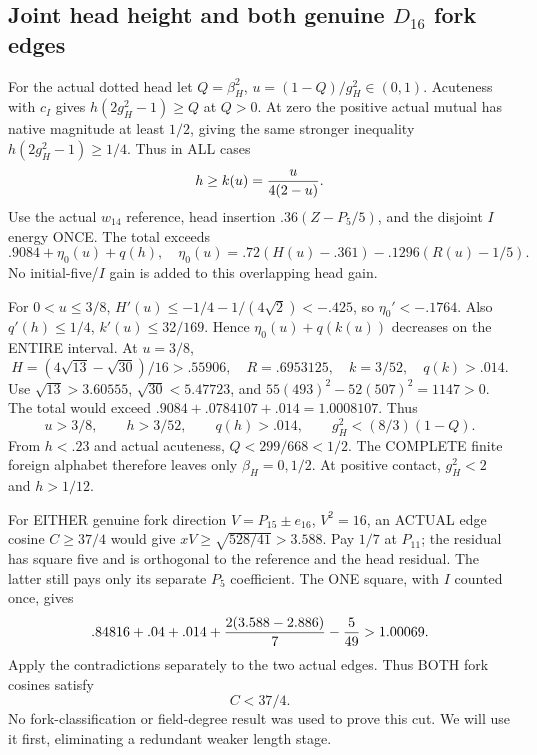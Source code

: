 \subsection{Joint head height and both genuine \(D_{16}\) fork edges}
\label{app:arithD16Ijointforkcut}

For the actual dotted head let
\(Q=\beta_H^2\), \(u=(1-Q)/g_H^2\in(0,1)\).
Acuteness with \(c_I\) gives
\(h(2g_H^2-1)\ge Q\) at \(Q>0\).
At zero the positive actual mutual
has native magnitude at least \(1/2\),
giving the same stronger inequality
\(h(2g_H^2-1)\ge1/4\).
Thus in ALL cases
\[
                         h\ge k(u)={u\over4(2-u)} .
\]
Use the actual \(w_{14}\) reference,
head insertion \(.36(Z-P_5/5)\), and
the disjoint \(I\) energy ONCE.
The total exceeds
\[
 .9084+\eta_0(u)+q(h),\quad
 \eta_0(u)=.72(H(u)-.361)-.1296(R(u)-1/5).
\]
No initial-five/\(I\) gain is added
to this overlapping head gain.

For \(0<u\le3/8\),
\(H'(u)\le-1/4-1/(4\sqrt2)<-.425\),
so \(\eta_0'<-.1764\).
Also \(q'(h)\le1/4\),
\(k'(u)\le32/169\).
Hence \(\eta_0(u)+q(k(u))\) decreases
on the ENTIRE interval.
At \(u=3/8\),
\[
 H=(4\sqrt{13}-\sqrt{30})/16>.55906,\quad
 R=.6953125,\quad k=3/52,\quad q(k)>.014 .
\]
Use \(\sqrt{13}>3.60555\),
\(\sqrt{30}<5.47723\), and
\(55(493)^2-52(507)^2=1147>0\).
The total would exceed
\(.9084+.0784107+.014=1.0008107\).
Thus
\[
 u>3/8,\qquad h>3/52,\qquad q(h)>.014,\qquad
                              g_H^2<(8/3)(1-Q).
\tag{D16Iu}\label{eq:arithD16Ijointbounds}
\]
From \(h<.23\) and actual acuteness,
\(Q<299/668<1/2\).
The COMPLETE finite foreign alphabet
therefore leaves only
\(\beta_H=0,1/2\).
At positive contact,
\(g_H^2<2\) and \(h>1/12\).

For EITHER genuine fork direction
\(V=P_{15}\pm e_{16}\), \(V^2=16\),
an ACTUAL edge cosine \(C\ge37/4\)
would give
\(xV\ge\sqrt{528/41}>3.588\).
Pay \(1/7\) at \(P_{11}\); the residual
has square five and is orthogonal
to the reference and the head residual.
The latter still pays only its separate
\(P_5\) coefficient.
The ONE square, with \(I\) counted once,
gives
\[
                    .84816+.04+.014+
                         {2(3.588-2.886)\over7}-{5\over49}>1.00069 .
\]
Apply the contradictions separately to
the two actual edges.
Thus BOTH fork cosines satisfy
\[
                                      C<37/4 .
\tag{D16IC}\label{eq:arithD16Iforkcutoff}
\]
No fork-classification or field-degree
result was used to prove this cut.
We will use it first, eliminating a
redundant weaker length stage.

